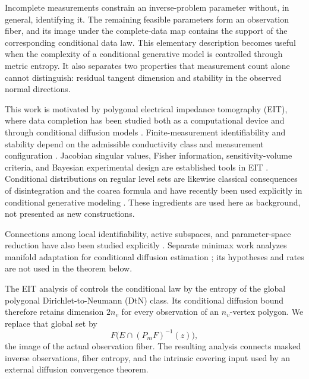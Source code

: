 \documentclass[11pt]{article}
\theoremstyle{definition}
\begin{document}
Incomplete measurements constrain an inverse-problem parameter without, in
general, identifying it.  The remaining feasible parameters form an
observation fiber, and its image under the complete-data map contains the
support of the corresponding conditional data law.  This elementary
description becomes useful when the complexity of a conditional generative
model is controlled through metric entropy.  It also separates two properties
that measurement count alone cannot distinguish: residual tangent dimension
and stability in the observed normal directions.

This work is motivated by polygonal electrical impedance tomography (EIT),
where data completion has been studied both as a computational device
\citep{buithanh2022completion} and through conditional diffusion models
\citep{chen2026completion}.  Finite-measurement identifiability and stability
depend on the admissible conductivity class and measurement configuration
\citep{harrach2019finite,beretta2021stability}.  Jacobian singular values,
Fisher information, sensitivity-volume criteria, and Bayesian experimental
design are established tools in EIT
\citep{nordebo2013fisher,onsager2024sensitivity,karimi2021bayesian,
hyvonen2024bayesian}.  Conditional distributions on regular level sets are
likewise classical consequences of disintegration and the coarea formula and
have recently been used explicitly in conditional generative modeling
\citep{akhyar2025levelsets}.  These ingredients are used here as background,
not presented as new constructions.

Connections among local identifiability, active subspaces, and parameter-space
reduction have also been studied explicitly \citep{brouwer2018identifiability}.
Separate minimax work analyzes manifold adaptation for conditional diffusion
estimation \citep{tang2024conditional}; its hypotheses and rates are not used
in the theorem below.

The EIT analysis of \citet{chen2026completion} controls the conditional law by
the entropy of the global polygonal Dirichlet-to-Neumann (DtN) class.  Its
conditional diffusion bound therefore retains dimension $2n_v$ for every
observation of an $n_v$-vertex polygon.  We replace that global set by
\[
 F\bigl(E\cap(P_mF)^{-1}(z)\bigr),
\]
the image of the actual observation fiber.  The resulting analysis connects
masked inverse observations, fiber entropy, and the intrinsic covering input
used by an external diffusion convergence theorem.
\end{document}
